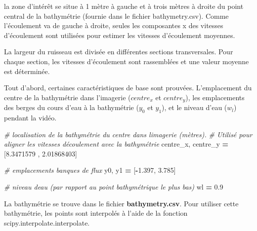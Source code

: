 \documentclass[
]{article}
\newenvironment{Shaded}{\begin{snugshade}}{\end{snugshade}}
\newcommand{\CommentTok}[1]{\textcolor[rgb]{0.56,0.35,0.01}{\textit{#1}}}
\newcommand{\FloatTok}[1]{\textcolor[rgb]{0.00,0.00,0.81}{#1}}
\newcommand{\NormalTok}[1]{#1}
\newcommand{\OperatorTok}[1]{\textcolor[rgb]{0.81,0.36,0.00}{\textbf{#1}}}
\begin{document}
la zone d'intérêt se situe à 1 mètre à gauche et à trois mètres à droite du point central de la bathymétrie (fournie dans le fichier bathymetry.csv). Comme l'écoulement va de gauche à droite, seules les composantes x des vitesses d'écoulement sont utilisées pour estimer les vitesses d'écoulement moyennes.

La largeur du ruisseau est divisée en différentes sections transversales. Pour chaque section, les vitesses d'écoulement sont rassemblées et une valeur moyenne est déterminée.

Tout d'abord, certaines caractéristiques de base sont prouvées. L'emplacement du centre de la bathymétrie dans l'imagerie (\(centre_x\) et \(centre_y\)), les emplacements des berges du cours d'eau à la bathymétrie (\(y_0\) et \(y_1\)), et le niveau d'eau (\(w_l\)) pendant la vidéo.

\begin{Shaded}
\begin{Highlighting}[]
\CommentTok{\# localisation de la bathymétrie du centre dans l\textquotesingle{}imagerie (mètres).}
\CommentTok{\# Utilisé pour aligner les vitesses d\textquotesingle{}écoulement avec la bathymétrie}
\NormalTok{centre\_x, centre\_y }\OperatorTok{=}\NormalTok{ [}\FloatTok{8.3471579}\NormalTok{ , }\FloatTok{2.01868403}\NormalTok{]}

\CommentTok{\# emplacements banques de flux}
\NormalTok{y0, y1 }\OperatorTok{=}\NormalTok{ [}\OperatorTok{{-}}\FloatTok{1.397}\NormalTok{, }\FloatTok{3.785}\NormalTok{]}

\CommentTok{\# niveau d\textquotesingle{}eau (par rapport au point bathymétrique le plus bas)}
\NormalTok{wl }\OperatorTok{=} \FloatTok{0.9}
\end{Highlighting}
\end{Shaded}

La bathymétrie se trouve dans le fichier \textbf{bathymetry.csv}. Pour utiliser cette bathymétrie, les points sont interpolés à l'aide de la fonction scipy.interpolate.interpolate.
\end{document}
